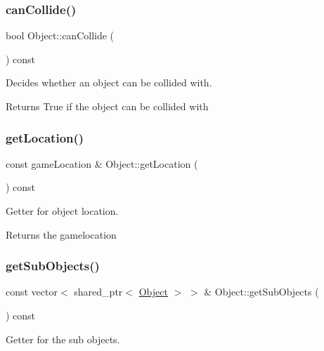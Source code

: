 \subsubsection{\texorpdfstring{can\+Collide()}{canCollide()}}
{\footnotesize\ttfamily bool Object\+::can\+Collide (\begin{DoxyParamCaption}{ }\end{DoxyParamCaption}) const}



Decides whether an object can be collided with. 

\begin{DoxyReturn}{Returns}
True if the object can be collided with 
\end{DoxyReturn}
\mbox{\label{classObject_a9a38df5eab9aae1d2706d04528883424}} 
\subsubsection{\texorpdfstring{get\+Location()}{getLocation()}}
{\footnotesize\ttfamily const game\+Location \& Object\+::get\+Location (\begin{DoxyParamCaption}{ }\end{DoxyParamCaption}) const}



Getter for object location. 

\begin{DoxyReturn}{Returns}
the gamelocation 
\end{DoxyReturn}
\mbox{\label{classObject_afdafb10e24b1025d598d1efbda61c873}} 
\subsubsection{\texorpdfstring{get\+Sub\+Objects()}{getSubObjects()}}
{\footnotesize\ttfamily const vector$<$ shared\+\_\+ptr$<$ \hyperlink{classObject}{Object} $>$ $>$ \& Object\+::get\+Sub\+Objects (\begin{DoxyParamCaption}{ }\end{DoxyParamCaption}) const}



Getter for the sub objects. 

